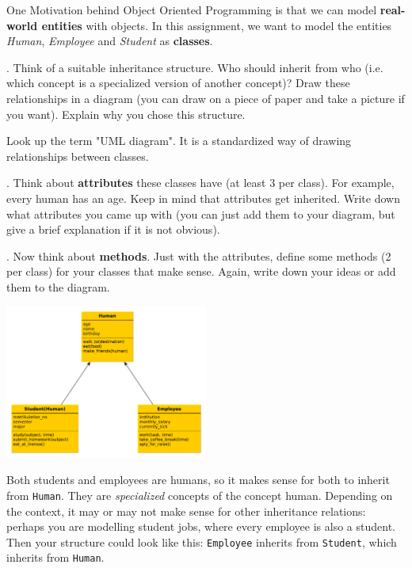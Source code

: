 One Motivation behind Object Oriented Programming is that we can model {\bf real-world entities} with objects. In this assignment, we want to model the entities {\it Human}, {\it Employee} and {\it Student} as {\bf classes}.

\vspace{1em}

. Think of a suitable inheritance structure. Who should inherit from who (i.e. which concept is a specialized version of another concept)? Draw these relationships in a diagram (you can draw on a piece of paper and take a picture if you want). Explain why you chose this structure.

\vspace{1em}

 Look up the term "UML diagram". It is a standardized way of drawing relationships between classes.

\vspace{1em}

. Think about {\bf attributes} these classes have (at least 3 per class). For example, every human has an age. Keep in mind that attributes get inherited. Write down what attributes you came up with (you can just add them to your diagram, but give a brief explanation if it is not obvious).

\vspace{1em}

. Now think about {\bf methods}. Just with the attributes, define some methods (2 per class) for your classes that make sense. Again, write down your ideas or add them to the diagram.

\vspace{1em}

\begin{solution}
    \begin{center}
        \includegraphics[width=0.5\textwidth]{09_OOP/humans.pdf}
    \end{center}

    \vspace{1em}

    \noindent Both students and employees are humans, so it makes sense for both to inherit from {\tt Human}. They are {\it specialized} concepts of the concept human. Depending on the context, it may or may not make sense for other inheritance relations: perhaps you are modelling student jobs, where every employee is also a student. Then your structure could look like this: {\tt Employee} inherits from {\tt Student}, which inherits from {\tt Human}.
\end{solution}

